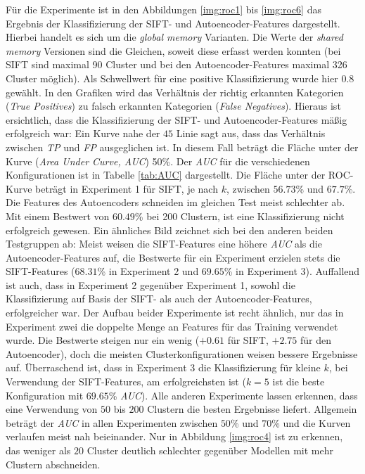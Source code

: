 Für die Experimente ist in den Abbildungen \ref{img:roc1} bis \ref{img:roc6} das Ergebnis der Klassifizierung der SIFT- und Autoencoder-Features dargestellt. Hierbei handelt es sich um die \textit{global memory} Varianten. Die Werte der \textit{shared memory} Versionen sind die Gleichen, soweit diese erfasst werden konnten (bei SIFT sind maximal 90 Cluster und bei den Autoencoder-Features maximal 326 Cluster möglich). Als Schwellwert für eine positive Klassifizierung wurde hier $0.8$ gewählt. In den Grafiken wird das Verhältnis der richtig erkannten Kategorien (\textit{True Positives}) zu falsch erkannten Kategorien (\textit{False Negatives}). Hieraus ist ersichtlich, dass die Klassifizierung der SIFT- und Autoencoder-Features mäßig erfolgreich war: Ein Kurve nahe der $45${\degree} Linie sagt aus, dass das Verhältnis zwischen \textit{TP} und \textit{FP} ausgeglichen ist. In diesem Fall beträgt die Fläche unter der Kurve (\textit{Area Under Curve, AUC}) 50\%. Der \textit{AUC} für die verschiedenen Konfigurationen ist in Tabelle \ref{tab:AUC} dargestellt. Die Fläche unter der ROC-Kurve beträgt in Experiment 1 für SIFT, je nach $k$, zwischen $56.73$\% und $67.7$\%. Die Features des Autoencoders schneiden im gleichen Test meist schlechter ab. Mit einem Bestwert von $60.49$\% bei 200 Clustern, ist eine Klassifizierung nicht erfolgreich gewesen.\newline
Ein ähnliches Bild zeichnet sich bei den anderen beiden Testgruppen ab: Meist weisen die SIFT-Features eine höhere \textit{AUC} als die Autoencoder-Features auf, die Bestwerte für ein Experiment erzielen stets die SIFT-Features ($68.31$\% in Experiment 2 und $69.65$\% in Experiment 3).\newline
Auffallend ist auch, dass in Experiment 2 gegenüber Experiment 1, sowohl die Klassifizierung auf Basis der SIFT- als auch der Autoencoder-Features, erfolgreicher war. Der Aufbau beider Experimente ist recht ähnlich, nur das in Experiment zwei die doppelte Menge an Features für das Training verwendet wurde. Die Bestwerte steigen nur ein wenig ($+0.61$ für SIFT, $+2.75$ für den Autoencoder), doch die meisten Clusterkonfigurationen weisen bessere Ergebnisse auf.\newline
Überraschend ist, dass in Experiment 3 die Klassifizierung für kleine $k$, bei Verwendung der SIFT-Features, am erfolgreichsten ist ($k=5$ ist die beste Konfiguration mit $69.65$\% \textit{AUC}). Alle anderen Experimente lassen erkennen, dass eine Verwendung von $50$ bis $200$ Clustern die besten Ergebnisse liefert.\newline
Allgemein beträgt der  \textit{AUC} in allen Experimenten zwischen $50$\% und $70$\% und die Kurven verlaufen meist nah beieinander. Nur in Abbildung \ref{img:roc4} ist zu erkennen, das weniger als $20$ Cluster deutlich schlechter gegenüber Modellen mit mehr Clustern abschneiden. 

